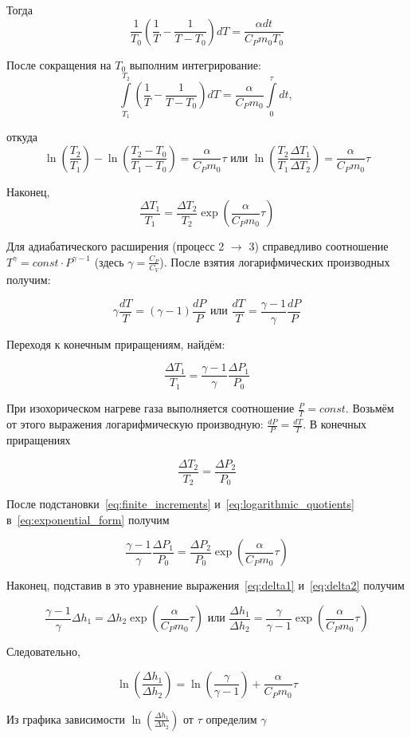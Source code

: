 \documentclass[a4paper, 14pt]{article}
\begin{document}
    Тогда
    \[ \frac{1}{T_0} \left( \frac{1}{T} - \frac{1}{T - T_0} \right) dT = \frac{\alpha dt}{C_P m_0 T_0} \]

    После сокращения на $T_0$ выполним интегрирование:
    \[ \int\limits_{T_1}^{T_2} \left( \frac{1}{T} - \frac{1}{T - T_0} \right) dT = \frac{\alpha}{C_P m_0} \int\limits_{0}^{\tau} dt \text{, }  \]

    откуда
    \[ \ln \left( \frac{T_2}{T_1} \right) - \ln \left( \frac{T_2 - T_0}{T_1 - T_0} \right) = \frac{\alpha}{C_P m_0} \tau \text{ или } \ln \left( \frac{T_2}{T_1} \frac{\Delta T_1}{\Delta T_2} \right) = \frac{\alpha}{C_P m_0} \tau \]

    Наконец,
    \begin{equation}
        \label{eq:exponential_form}
        \frac{\Delta T_1}{T_1} = \frac{\Delta T_2}{T_2} \exp (\frac{\alpha}{C_P m_0} \tau)
    \end{equation}

    Для адиабатического расширения (процесс 2 $\rightarrow$ 3) справедливо соотношение $T^{\gamma} = const \cdot
    P^{\gamma - 1}$ (здесь $\gamma = \frac{C_P}{C_V}$). После взятия логарифмических производных получим:

    \[ \gamma \frac{dT}{T} = (\gamma - 1) \frac{dP}{P} \text{ или } \frac{dT}{T} = \frac{\gamma - 1}{\gamma} \frac{dP}{P} \]

    Переходя к конечным приращениям, найдём:

    \begin{equation}
        \label{eq:finite_increments}
        \frac{ \Delta T_1}{T_1} = \frac{\gamma - 1}{\gamma} \frac{\Delta P_1}{P_0}
    \end{equation}

    При изохорическом нагреве газа выполняется соотношение $\frac{P}{T} = const$.
    Возьмём от этого выражения логарифмическую производную: $\frac{dP}{P} = \frac{dT}{T}$.
    В конечных приращениях

    \begin{equation}
        \label{eq:logarithmic_quotients}
        \frac{\Delta T_2}{T_2} = \frac{\Delta P_2}{P_0}
    \end{equation}

    После подстановки~\eqref{eq:finite_increments} и~\eqref{eq:logarithmic_quotients} в~\eqref{eq:exponential_form}
    получим

    \[ \frac{\gamma - 1}{\gamma} \frac{\Delta P_1}{P_0} = \frac{\Delta P_2}{P_0} \exp \left(\frac{\alpha}{C_P m_0} \tau
    \right) \]

    Наконец, подставив в это уравнение выражения~\eqref{eq:delta1} и~\eqref{eq:delta2} получим

    \[ \frac{\gamma - 1}{\gamma} \Delta h_1 = \Delta h_2 \exp \left(\frac{\alpha}{C_P m_0} \tau\right) \text{ или }
    \frac{\Delta h_1}{\Delta h_2} = \frac{\gamma}{\gamma - 1} \exp \left(\frac{\alpha}{C_P m_0} \tau\right) \]

    Следовательно,

    \[ \ln \left(\frac{\Delta h_1}{\Delta h_2}\right) = \ln \left(\frac{\gamma}{\gamma - 1}\right) +
    \frac{\alpha}{C_P m_0} \tau \]

    Из графика зависимости $\ln \left(\frac{\Delta h_1}{\Delta h_2}\right)$ от $\tau$ определим $\gamma$
\end{document}
